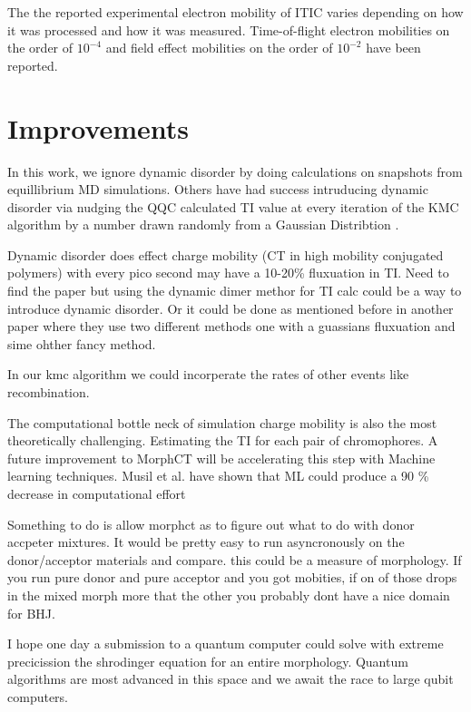 The the reported
experimental electron mobility of ITIC varies depending on how it was processed and how it was measured. Time-of-flight electron mobilities on the order of $10^{-4}$ \cite{Mica2018} and field effect mobilities on the order of
$10^{-2}$ \cite{Park2018} have been reported. 

\section{Improvements}

In this work, we ignore dynamic disorder by doing calculations on snapshots from equillibrium MD simulations.
Others have had success intruducing dynamic disorder via nudging the QQC calculated TI value at every
iteration of the KMC algorithm by a number drawn randomly from a Gaussian Distribtion \cite{Gali2017}.

Dynamic disorder does effect charge mobility (CT in high mobility conjugated polymers) with every pico second
may have a 10-20\% fluxuation in TI. Need to find the paper but using the dynamic dimer methor for TI calc
could be a way to introduce dynamic disorder. Or it could be done as mentioned before in another paper where
they use two different methods one with a guassians fluxuation and sime ohther fancy method. 

In our kmc algorithm we could incorperate the rates of other events like recombination.

The computational bottle neck of simulation charge mobility is also the most theoretically challenging.
Estimating the TI for each pair of chromophores. A future improvement to MorphCT will be accelerating this step
with Machine learning techniques. Musil et al. have shown that ML could produce a 90 \% decrease in
computational effort \cite{Musil2018}

Something to do is allow morphct as to figure out what to do with donor accpeter mixtures. It would be pretty
easy to run asyncronously on the donor/acceptor materials and compare. this could be a measure of morphology.
If you run pure donor and pure acceptor and you got mobities, if on of those drops in the mixed morph more
that the other you probably dont have a nice domain for BHJ.

I hope one day a submission to a quantum computer could solve with extreme precicission the shrodinger
equation for an entire morphology. Quantum algorithms are most advanced in this space and we await the race
to large qubit computers. 

